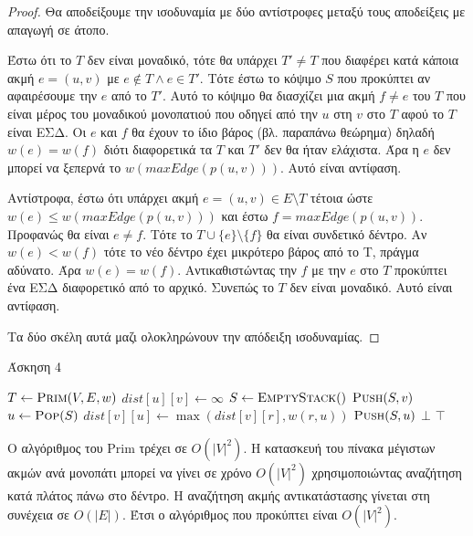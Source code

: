 \documentclass[11pt,a4paper,oneside]{report}
\begin{document}
\begin{proof}
Θα αποδείξουμε την ισοδυναμία με δύο αντίστροφες μεταξύ τους αποδείξεις με απαγωγή σε άτοπο.

Έστω ότι το $T$ δεν είναι μοναδικό, τότε θα υπάρχει $T' \neq T$ που διαφέρει κατά κάποια ακμή $e = (u, v)$ με $e \not\in T \land e \in T'$. Τότε έστω το κόψιμο $S$ που προκύπτει αν αφαιρέσουμε την $e$ από το $T'$. Αυτό το κόψιμο θα διασχίζει μια ακμή $f \neq e$ του $T$ που είναι μέρος του μοναδικού μονοπατιού που οδηγεί από την $u$ στη $v$ στο $T$ αφού το $T$ είναι ΕΣΔ. Οι $e$ και $f$ θα έχουν το ίδιο βάρος (βλ. παραπάνω θεώρημα) δηλαδή $w( e ) = w( f )$ διότι διαφορετικά τα $T$ και $T'$ δεν θα ήταν ελάχιστα. Άρα η $e$ δεν μπορεί να ξεπερνά το $w(maxEdge(p(u, v)))$. Αυτό είναι αντίφαση.

Αντίστροφα, έστω ότι υπάρχει ακμή $e = (u, v) \in E \setminus T$ τέτοια ώστε $w( e ) \leq w(maxEdge(p(u, v)))$ και έστω $f = maxEdge(p(u, v))$. Προφανώς θα είναι $e \neq f$. Τότε το $T \cup \{e\} \setminus \{f\}$ θα είναι συνδετικό δέντρο. Αν $w( e ) < w( f )$ τότε το νέο δέντρο έχει μικρότερο βάρος από το T, πράγμα αδύνατο. Άρα $w( e ) = w( f )$. Αντικαθιστώντας την $f$ με την $e$ στο $T$ προκύπτει ένα ΕΣΔ διαφορετικό από το αρχικό. Συνεπώς το $T$ δεν είναι μοναδικό. Αυτό είναι αντίφαση.

Τα δύο σκέλη αυτά μαζι ολοκληρώνουν την απόδειξη ισοδυναμίας.
\end{proof}

\begin{algorithm}[H]
\caption{\textgreek{Άσκηση 4}}
\begin{algorithmic}[1]

	\State $T \gets \Call{Prim}{V, E, w}$
		\State $dist[ u ][ v ] \gets \infty$
	\EndFor
		\State $S \gets \Call{EmptyStack}$
		\State $\Call{Push}{S,v}$
			\State $u \gets \Call{Pop}{S}$
					\State $dist[ v ][ u ] \gets \max( dist[ v ][ r ], w( r, u ) )$
					\State $\Call{Push}{S,u}$
				\EndIf
			\EndFor
		\EndWhile
	\EndFor
			\State \Return $\bot$
		\EndIf
	\EndFor
	\State \Return $\top$
\EndProcedure
\end{algorithmic}
\end{algorithm}

Ο αλγόριθμος του \textlatin{Prim} τρέχει σε $O( |V|^2 )$. Η κατασκευή του πίνακα μέγιστων ακμών ανά μονοπάτι μπορεί να γίνει σε χρόνο $O( |V|^2 )$ χρησιμοποιώντας αναζήτηση κατά πλάτος πάνω στο δέντρο. Η αναζήτηση ακμής αντικατάστασης γίνεται στη συνέχεια σε $O( |E| )$. Έτσι ο αλγόριθμος που προκύπτει είναι $O( |V|^2 )$.
\end{document}
